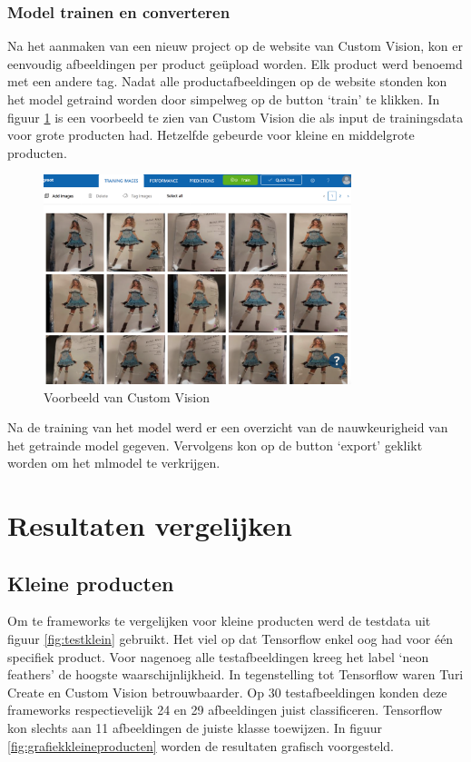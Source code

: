 \subsubsection{Model trainen en converteren}
\label{sssec:Model trainen en converteren}

Na het aanmaken van een nieuw project op de website van Custom Vision, kon er eenvoudig afbeeldingen per product geüpload worden. Elk product werd benoemd met een andere tag. Nadat alle productafbeeldingen op de website stonden kon het model getraind worden door simpelweg op de button ‘train’ te klikken. In figuur \ref{fig:customvision} is een voorbeeld te zien van Custom Vision die als input de trainingsdata voor grote producten had. Hetzelfde gebeurde voor kleine en middelgrote producten.

\begin{figure}
    \centering
        \includegraphics[width=0.8\textwidth]{img/customvision.png}
    \caption{Voorbeeld van Custom Vision}
    \label{fig:customvision}
  \end{figure}

Na de training van het model werd er een overzicht van de nauwkeurigheid van het getrainde model gegeven. Vervolgens kon op de button ‘export’ geklikt worden om het mlmodel te verkrijgen.

\section{Resultaten vergelijken}
\label{sec:Resultaten vergelijken}

\subsection{Kleine producten}
\label{ssec:Kleine producten}

Om te frameworks te vergelijken voor kleine producten werd de testdata uit figuur \ref{fig:testklein} gebruikt. Het viel op dat Tensorflow enkel oog had voor één specifiek product. Voor nagenoeg alle testafbeeldingen kreeg het label ‘neon feathers’ de hoogste waarschijnlijkheid. In tegenstelling tot Tensorflow waren Turi Create en Custom Vision betrouwbaarder. Op 30 testafbeeldingen konden deze frameworks respectievelijk 24 en 29 afbeeldingen juist classificeren. Tensorflow kon slechts aan 11 afbeeldingen de juiste klasse toewijzen. In figuur \ref{fig:grafiekkleineproducten} worden de resultaten grafisch voorgesteld.

